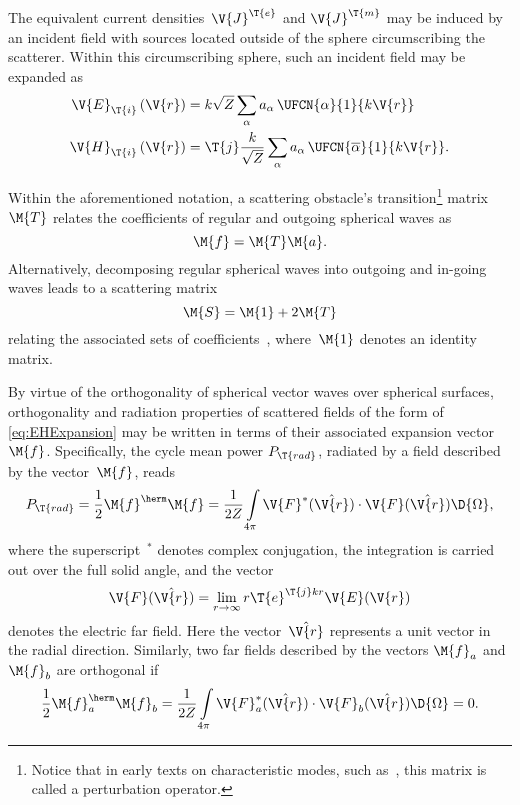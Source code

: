 \documentclass[journal]{IEEEtran}
\providecommand{\Je}{\V{J}^\T{e}} %
\providecommand{\Jm}{\V{J}^\T{m}} %
\begin{document}
The equivalent current densities~$\Je$ and $\Jm$ may be induced by an incident field with sources located outside of the sphere circumscribing the scatterer.  Within this circumscribing sphere, such an incident field may be expanded as
\begin{equation}
\begin{aligned}
    \label{eq:EHIExpansion}
    \V{E}_\T{i}\left(\V{r}\right) &= k\sqrt{Z}\sum_\alpha a_{\alpha}\,\UFCN{\alpha}{1}{k\V{r}} \\
        \V{H}_\T{i}\left(\V{r}\right) &= \T{j} \dfrac{k}{\sqrt{Z}} \sum_\alpha a_{\alpha}\,\UFCN{\overline{\alpha}}{1}{k\V{r}}.
\end{aligned}
\end{equation}

Within the aforementioned notation, a scattering obstacle's transition\footnote{Notice that in early texts on characteristic modes, such as~\cite{GarbaczTurpin_AGeneralizedExpansionForRadiatedAndScatteredFields,HarringtonMautz_TheoryOfCharacteristicModesForConductingBodies}, this matrix is called a perturbation operator.} matrix~$\M{T}$ relates the coefficients of regular and outgoing spherical waves as~\cite[Chap.~7.8]{Kristensson_ScatteringBook}
\begin{equation}
    \label{eq:Tmat}
    \M{f} = \M{T}\M{a}.
\end{equation}
Alternatively, decomposing regular spherical waves into outgoing and in-going waves leads to a scattering matrix 
\begin{equation}
    \label{eq:Sdef}
    \M{S} = \M{1}+2\M{T}
\end{equation} 
relating the associated sets of coefficients~\cite[Chap.~7.8]{Kristensson_ScatteringBook}, where~$\M{1}$ denotes an identity matrix.

By virtue of the orthogonality of spherical vector waves over spherical surfaces, orthogonality and radiation properties of scattered fields of the form of \eqref{eq:EHExpansion} may be written in terms of their associated expansion vector $\M{f}$.  Specifically, the cycle mean power $P_\T{rad}$, radiated by a field described by the vector~$\M{f}$, reads
\begin{equation}
\label{eq:PradFF}
    P_\T{rad} = \frac{1}{2}\M{f}^\herm \M{f}= \frac{1}{2Z} \int \limits_{4 \pi} \V{F}^*(\hat{\V{r}}) \cdot \V{F}(\hat{\V{r}}) \D{\Omega},
\end{equation}
where the superscript~${}^{\ast}$ denotes complex conjugation, the integration is carried out over the full solid angle, and the vector
\begin{equation}
    \V{F}(\hat{\V{r}}) = \lim \limits_{r \to \infty } r \T{e}^{\T{j} kr} \V{E}(\V{r})
\end{equation}
denotes the electric far field.  Here the vector~$\hat{\V{r}}$ represents a unit vector in the radial direction. Similarly, two far fields described by the vectors $\M{f}_a$ and $\M{f}_b$ are orthogonal if
\begin{equation}
\label{eq:FForth}
    \frac{1}{2}\M{f}^\herm_a \M{f}_b= \frac{1}{2Z} \int \limits_{4 \pi} \V{F}_a^*(\hat{\V{r}}) \cdot \V{F}_b(\hat{\V{r}}) \D{\Omega} = 0.
\end{equation}
\end{document}
